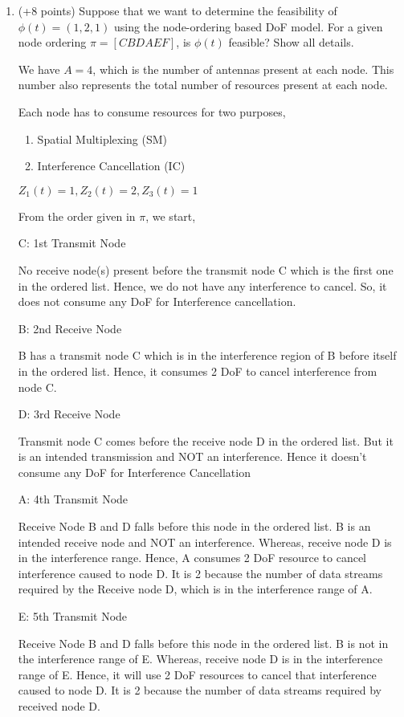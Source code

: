 \documentclass[a4paper,oneside,10pt]{report}
\begin{document}
\begin{enumerate}

\item (+8 points) Suppose that we want to determine the feasibility of $\phi(t)=(1,2,1)$ using the node-ordering based DoF model. For a given node ordering $\pi=[C B D A E F]$, is $\phi(t)$ feasible? Show all details.

We have $A = 4$, which is the number of antennas present at each node. This number also represents the total number of resources present at each node.

Each node has to consume resources for two purposes,
\begin{enumerate}
	\item Spatial Multiplexing (SM)
	\item Interference Cancellation (IC)
\end{enumerate}

$Z_1(t) = 1, Z_2(t) = 2, Z_3(t) = 1$

From the order given in $\pi$, we start,

C: 1st Transmit Node

No receive node(s) present before the transmit node C which is the first one in the ordered list. Hence, we do not have any interference to cancel. So, it does not consume any DoF for Interference cancellation.

B: 2nd Receive Node

B has a transmit node C which is in the interference region of B before itself in the ordered list. Hence, it consumes 2 DoF to cancel interference from node C.

D: 3rd Receive Node

Transmit node C comes before the receive node D in the ordered list. But it is an intended transmission and NOT an interference. Hence it doesn't consume any DoF for Interference Cancellation

A: 4th Transmit Node

Receive Node B and D falls before this node in the ordered list. B is an intended receive node and NOT an interference. Whereas, receive node D is in the interference range. Hence, A consumes 2 DoF resource to cancel interference caused to node D. It is 2 because the number of data streams required by the Receive node D, which is in the interference range of A.

E: 5th Transmit Node

Receive Node B and D falls before this node in the ordered list. B is not in the interference range of E. Whereas, receive node D is in the interference range of E. Hence, it will use 2 DoF resources to cancel that interference caused to node D. It is 2 because the number of data streams required by received node D.


\end{enumerate}
\end{document}
